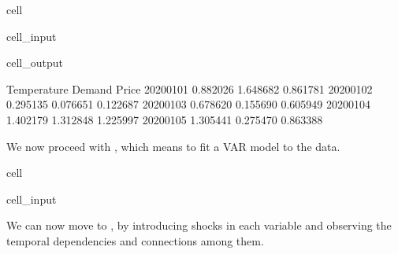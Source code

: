 \documentclass[letterpaper,10pt,english]{jupyterBook}
\begin{document}
\begin{sphinxuseclass}{cell}
\begin{sphinxVerbatimInput}
\begin{sphinxuseclass}{cell_input}
\begin{sphinxVerbatim}[commandchars=\\\{\}]
\end{sphinxVerbatim}

\end{sphinxuseclass}\end{sphinxVerbatimInput}
\begin{sphinxVerbatimOutput}

\begin{sphinxuseclass}{cell_output}
\begin{sphinxVerbatim}[commandchars=\\\{\}]
            Temperature    Demand     Price
2020\PYGZhy{}01\PYGZhy{}01     0.882026  1.648682  0.861781
2020\PYGZhy{}01\PYGZhy{}02     0.295135  0.076651  0.122687
2020\PYGZhy{}01\PYGZhy{}03     0.678620  0.155690  0.605949
2020\PYGZhy{}01\PYGZhy{}04     1.402179  1.312848  1.225997
2020\PYGZhy{}01\PYGZhy{}05     1.305441  0.275470  0.863388
\end{sphinxVerbatim}

\end{sphinxuseclass}\end{sphinxVerbatimOutput}

\end{sphinxuseclass}
\sphinxAtStartPar
We now proceed with , which means to fit a VAR model to the data.

\begin{sphinxuseclass}{cell}\begin{sphinxVerbatimInput}

\begin{sphinxuseclass}{cell_input}
\begin{sphinxVerbatim}[commandchars=\\\{\}]
   

  
   

\end{sphinxVerbatim}

\end{sphinxuseclass}\end{sphinxVerbatimInput}

\end{sphinxuseclass}
\sphinxAtStartPar
We can now move to , by introducing shocks in each variable and observing the temporal dependencies and connections among them.
\end{document}
